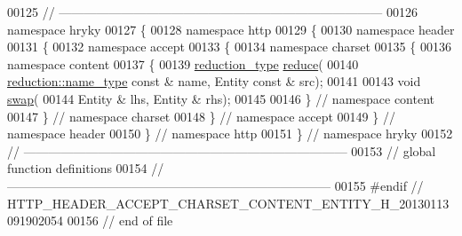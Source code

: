 \begin{DoxyCode}
00125 \textcolor{comment}{//
      ------------------------------------------------------------------------------}
00126 \textcolor{keyword}{namespace }hryky
00127 \{
00128 \textcolor{keyword}{namespace }http
00129 \{
00130 \textcolor{keyword}{namespace }header
00131 \{
00132 \textcolor{keyword}{namespace }accept
00133 \{
00134 \textcolor{keyword}{namespace }charset
00135 \{
00136 \textcolor{keyword}{namespace }content
00137 \{
00139     \hyperlink{namespacehryky_a343a9a4c36a586be5c2693156200eadc}{reduction_type} \hyperlink{namespacehryky_1_1http_a08fc36a78a8e2908140fcd102829a566}{reduce}(
00140         \hyperlink{namespacehryky_1_1reduction_ac686c30a4c8d196bbd0f05629a6b921f}{reduction::name_type} \textcolor{keyword}{const} & name, Entity \textcolor{keyword}{const} & src);
00141 
00143     \textcolor{keywordtype}{void} \hyperlink{namespacehryky_1_1http_a38e62595ad532d18fbc65ceb61973aec}{swap}(
00144         Entity & lhs, Entity & rhs);
00145 
00146 \} \textcolor{comment}{// namespace content}
00147 \} \textcolor{comment}{// namespace charset}
00148 \} \textcolor{comment}{// namespace accept}
00149 \} \textcolor{comment}{// namespace header}
00150 \} \textcolor{comment}{// namespace http}
00151 \} \textcolor{comment}{// namespace hryky}
00152 \textcolor{comment}{//
      ------------------------------------------------------------------------------}
00153 \textcolor{comment}{// global function definitions}
00154 \textcolor{comment}{//
      ------------------------------------------------------------------------------}
00155 \textcolor{preprocessor}{#endif // HTTP\_HEADER\_ACCEPT\_CHARSET\_CONTENT\_ENTITY\_H\_20130113091902054}
00156 \textcolor{preprocessor}{}\textcolor{comment}{// end of file}
\end{DoxyCode}
